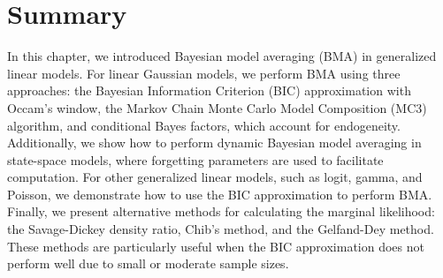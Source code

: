     

\section{Summary}\label{sec10_5}
In this chapter, we introduced Bayesian model averaging (BMA) in generalized linear models. For linear Gaussian models, we perform BMA using three approaches: the Bayesian Information Criterion (BIC) approximation with Occam's window, the Markov Chain Monte Carlo Model Composition (MC3) algorithm, and conditional Bayes factors, which account for endogeneity. Additionally, we show how to perform dynamic Bayesian model averaging in state-space models, where forgetting parameters are used to facilitate computation. For other generalized linear models, such as logit, gamma, and Poisson, we demonstrate how to use the BIC approximation to perform BMA. Finally, we present alternative methods for calculating the marginal likelihood: the Savage-Dickey density ratio, Chib's method, and the Gelfand-Dey method. These methods are particularly useful when the BIC approximation does not perform well due to small or moderate sample sizes.

